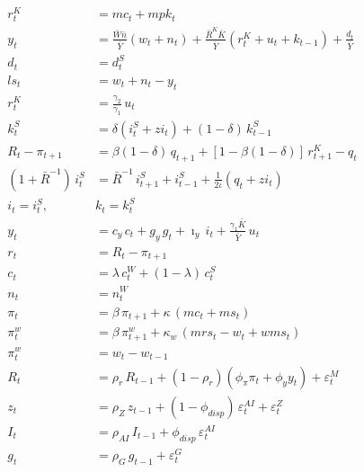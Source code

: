 \documentclass[12pt]{article}
\begin{document}
\begin{align}
r^K_t &= mc_t + mpk_t
  \tag{16. Capital rental rate} \\[4pt]
y_t &= \tfrac{\bar{W}\bar{n}}{\bar{Y}}(w_t + n_t)
     + \tfrac{\bar{R}^K\bar{K}}{\bar{Y}}(r^K_t + u_t + k_{t-1})
     + \tfrac{d_t}{\bar{Y}}
  \tag{17. Income identity} \\[4pt]
d_t &= d^S_t
  \tag{18. Profits to capitalists} \\[4pt]
ls_t &= w_t + n_t - y_t
  \tag{19. Labor share} \\[4pt]
r^K_t &= \tfrac{\gamma_2}{\gamma_1}\, u_t
  \tag{20. Variable capital utilization} \\[4pt]
k^S_t &= \delta(i^S_t + zi_t) + (1-\delta)\, k^S_{t-1}
  \tag{21. Capital law of motion} \\[4pt]
R_t - \pi_{t+1} &= \beta(1-\delta)\, q_{t+1}
  + [1-\beta(1-\delta)]\, r^K_{t+1} - q_t
  \tag{22. Capital arbitrage / Tobin's Q} \\[4pt]
(1+\bar{R}^{-1})\, i^S_t &= \bar{R}^{-1}\, i^S_{t+1} + i^S_{t-1}
  + \tfrac{1}{2\iota}(q_t + zi_t)
  \tag{23. Investment Euler} \\[4pt]
i_t = i^S_t,\quad & k_t = k^S_t
  \tag{24. Investment and capital aggregation} \\[4pt]
y_t &= c_y\, c_t + g_y\, g_t + \imath_y\, i_t
     + \tfrac{\gamma_1\bar{K}}{\bar{Y}}\, u_t
  \tag{25. Resource constraint} \\[4pt]
r_t &= R_t - \pi_{t+1}
  \tag{26. Fisher equation} \\[4pt]
c_t &= \lambda\, c^W_t + (1-\lambda)\, c^S_t
  \tag{27. Consumption aggregation} \\[4pt]
n_t &= n^W_t
  \tag{28. Labor aggregation} \\[4pt]
\pi_t &= \beta\, \pi_{t+1} + \kappa\,(mc_t + ms_t)
  \tag{29. New Keynesian Phillips curve} \\[4pt]
\pi^w_t &= \beta\, \pi^w_{t+1} + \kappa_w\,(mrs_t - w_t + wms_t)
  \tag{30. Wage Phillips curve} \\[4pt]
\pi^w_t &= w_t - w_{t-1}
  \tag{31. Wage inflation} \\[4pt]
R_t &= \rho_r\, R_{t-1}
  + (1-\rho_r)(\phi_\pi \pi_t + \phi_y y_t) + \varepsilon^M_t
  \tag{32. Taylor rule} \\[4pt]
z_t &= \rho_Z\, z_{t-1}
  + (1-\phi_{disp})\,\varepsilon^{AI}_t + \varepsilon^Z_t
  \tag{33. Labor-augmenting tech} \\[4pt]
I_t &= \rho_{AI}\, I_{t-1} + \phi_{disp}\,\varepsilon^{AI}_t
  \tag{34. Automation frontier} \\[4pt]
g_t &= \rho_G\, g_{t-1} + \varepsilon^G_t

\end{align}
\end{document}
